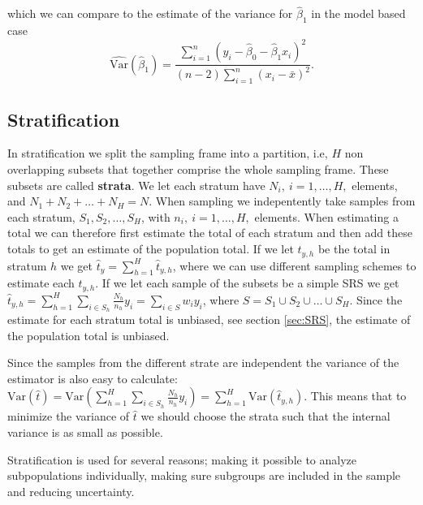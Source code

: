 \documentclass{article}
\begin{document}
which we can compare to the estimate of the variance for \(\hat{\beta}_1\) in
the model based case
\begin{equation*}
 \widehat{\mathrm{Var}} \left( \hat{\beta}_1 \right) = \frac{\sum_{i = 1}^n\left( y_i - \hat{\beta}_0 -
 \hat{\beta}_1 x_i \right)^2}{
   \left( n - 2 \right)\sum_{i = 1}^n \left( x_i - \bar{x} \right)^2}.
\end{equation*}


\subsection{Stratification} \label{sec:strat}

In stratification we split the sampling frame into a partition, i.e, \(H\) non
overlapping subsets that together comprise the whole sampling frame. These
subsets are called \textbf{strata}. We let each stratum have \(N_i,\ i = 1, \dots
, H,\) elements, and \(N_1 + N_2 + \dots + N_H = N\). When sampling we
indepentently take samples from each stratum, \(S_1, S_2, \dots, S_H\), with \(n_i,\ i = 1, \dots
, H,\) elements. When
estimating a total we can therefore first estimate the total of each stratum and
then add these totals to get an estimate of the population total.
If we let \(t_{y,h}\) be the total in stratum \(h\) we get \(\hat{t}_y =
\sum_{h = 1}^H \hat{t}_{y, h} \), where we can use different sampling schemes to
estimate each \(t_{y, h}\).
If we let each sample of the subsets be a simple SRS we get \( \hat{t}_{y, h} =
\sum_{h = 1}^H\sum_{i \in S_h}\frac{N_h}{n_h}y_i = \sum_{i \in S} w_i y_i\),
where \(S = S_1 \cup S_2 \cup \dots \cup S_H\).
Since the estimate for each
stratum total is unbiased, see section \ref{sec:SRS}, the estimate of the population
total is unbiased.


Since the samples from the different strate are independent the variance of the estimator is also
easy to calculate: \(\mathrm{Var}(\hat{t}) = \mathrm{Var}\left(\sum_{h =
   1}^H\sum_{i \in S_h}\frac{N_h}{n_h}y_i\right) = \sum_{h =
   1}^H\mathrm{Var}\left(\hat{t}_{y, h}\right)\). This
means that to minimize the variance of \(\hat{t}\) we should choose the strata
such that the internal variance is as small as possible.

Stratification is used for several reasons; making it possible to analyze
subpopulations individually, making sure subgroups are included in the sample
and reducing uncertainty.
\end{document}
